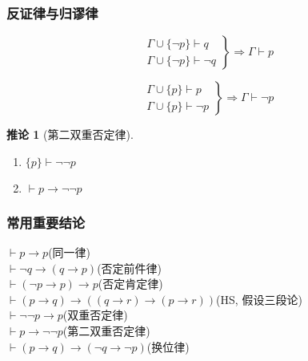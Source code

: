 \documentclass[
    color=black,
    device=normal,
    lang=cn
]{elegantnote}
\newtheorem{deduction}{推论}[subsection]
\begin{document}
\subsubsection{反证律与归谬律}
\begin{theorem}[反证律]
    $$
        \left.
        \begin{matrix}
            \Gamma\cup\{\lnot p\}\vdash q \\
            \Gamma\cup\{\lnot p\}\vdash\lnot q
        \end{matrix}
        \right\}\Rightarrow \Gamma\vdash p
    $$
\end{theorem}
\begin{theorem}[归谬律]
    $$
        \left.
        \begin{matrix}
            \Gamma\cup\{p\}\vdash p \\
            \Gamma\cup\{p\}\vdash\lnot p
        \end{matrix}
        \right\}\Rightarrow \Gamma\vdash \lnot p
    $$
\end{theorem}
\begin{deduction}[第二双重否定律]
    \begin{enumerate}[label=$\arabic*^\circ$, topsep = -1em]
        \item $\{p\}\vdash\lnot\lnot p$
        \item $\vdash p\to \lnot\lnot p$
    \end{enumerate}
\end{deduction}

\subsubsection{常用重要结论}
\noindent$\vdash p\to p$\hfill (同一律)\\
$\vdash \lnot q\to(q\to p)$\hfill (否定前件律)\\
$\vdash (\lnot p\to p)\to p$\hfill (否定肯定律)\\
$\vdash (p\to q)\to((q\to r)\to (p\to r))$\hfill (HS, 假设三段论)\\
$\vdash \lnot\lnot p\to p$\hfill (双重否定律)\\
$\vdash p\to \lnot \lnot p$\hfill (第二双重否定律)\\
$\vdash (p\to q)\to (\lnot q\to \lnot p)$\hfill (换位律)
\end{document}
